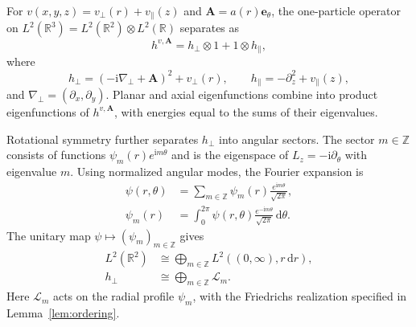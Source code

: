 \documentclass[11pt,a4paper]{article}
\theoremstyle{remark}
\theoremstyle{plain}
\newcommand{\R}{\mathbb R}
\newcommand{\A}{\mathbf A}
\newcommand{\ee}{\mathbf e_\theta}
\begin{document}
For $v(x,y,z)=v_\perp(r)+v_\parallel(z)$ and $\A=a(r)\ee$, the
one-particle operator on
$L^2(\R^3)=L^2(\R^2)\otimes L^2(\R)$ separates as
\begin{equation*}
 h^{v,\A}=h_\perp\otimes1+1\otimes h_\parallel,
\end{equation*}
where
\begin{equation*}
 h_\perp=(-\mathrm{i}\nabla_\perp+\A)^2+v_\perp(r),\qquad
 h_\parallel=-\partial_z^2+v_\parallel(z),
\end{equation*}
and $\nabla_\perp=(\partial_x,\partial_y)$. Planar and axial
eigenfunctions combine into product eigenfunctions of $h^{v,\A}$,
with energies equal to the sums of their eigenvalues.

Rotational symmetry further separates $h_\perp$ into angular
sectors. The sector $m\in\mathbb Z$ consists of functions
$\psi_m(r)e^{\mathrm{i}m\theta}$ and is the eigenspace of
$L_z=-\mathrm{i}\partial_\theta$ with eigenvalue $m$.
Using normalized angular modes, the Fourier expansion is
\begin{align*}
 \psi(r,\theta)&=\sum_{m\in\mathbb Z}\psi_m(r)
            \frac{e^{\mathrm{i}m\theta}}{\sqrt{2\pi}},\\
 \psi_m(r)&=\int_0^{2\pi}\psi(r,\theta)
            \frac{e^{-\mathrm{i}m\theta}}{\sqrt{2\pi}}\,\mathrm{d}\theta.
\end{align*}
The unitary map $\psi\mapsto(\psi_m)_{m\in\mathbb Z}$ gives
\begin{align*}
 L^2(\R^2)&\cong\bigoplus_{m\in\mathbb Z}L^2((0,\infty),r\,\mathrm{d}r),\\
 h_\perp&\cong\bigoplus_{m\in\mathbb Z}\mathcal L_m.
\end{align*}
Here $\mathcal L_m$ acts on the radial profile $\psi_m$, with the
Friedrichs realization specified in Lemma~\ref{lem:ordering}.
\end{document}
